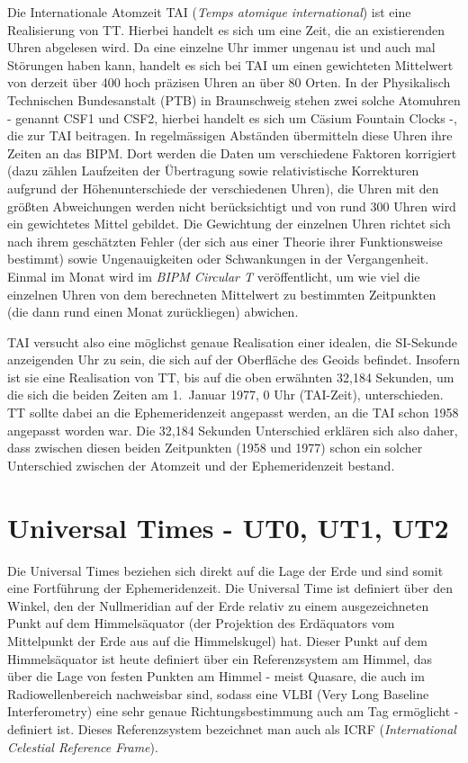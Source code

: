 Die Internationale Atomzeit TAI 
(\textit{Temps atomique international}) ist eine Realisierung von TT. Hierbei
handelt es sich um eine Zeit, die an existierenden Uhren abgelesen wird. Da eine einzelne Uhr immer
ungenau ist und auch mal St\"orungen haben kann, handelt es sich bei TAI um einen gewichteten
Mittelwert von derzeit \"uber 400 hoch pr\"azisen Uhren an \"uber 80 Orten. In der Physikalisch Technischen
Bundesanstalt (PTB) 
in Braunschweig stehen zwei solche Atomuhren - genannt CSF1 und CSF2, hierbei handelt
es sich um C\"asium Fountain Clocks -, die zur
TAI beitragen. In regelm\"assigen Abst\"anden \"ubermitteln diese Uhren ihre Zeiten an das
BIPM. Dort werden die Daten um verschiedene Faktoren korrigiert (dazu z\"ahlen Laufzeiten der \"Ubertragung
sowie relativistische Korrekturen aufgrund der H\"ohenunterschiede der verschiedenen Uhren), die
Uhren mit den gr\"o\ss ten Abweichungen werden nicht ber\"ucksichtigt und von rund 300 Uhren wird
ein gewichtetes Mittel gebildet. Die Gewichtung der einzelnen Uhren richtet sich nach ihrem gesch\"atzten 
Fehler (der sich aus einer Theorie ihrer Funktionsweise bestimmt) sowie Ungenauigkeiten oder
Schwankungen in der Vergangenheit. Einmal im Monat wird im
\textit{BIPM Circular T} ver\"offentlicht, um wie viel die einzelnen Uhren von dem berechneten Mittelwert
zu bestimmten Zeitpunkten (die dann rund einen Monat zur\"uckliegen) abwichen. 

TAI versucht also eine m\"oglichst genaue Realisation einer idealen, die SI-Sekunde anzeigenden Uhr
zu sein, die sich auf der Oberfl\"ache des Geoids befindet. 
Insofern ist sie eine Realisation von TT, bis auf die oben erw\"ahnten 32,184 Sekunden, um die
sich die beiden Zeiten am 1.\ Januar 1977, 0 Uhr (TAI-Zeit), unterschieden. TT sollte dabei an die Ephemeridenzeit
angepasst werden, an die TAI schon 1958 angepasst worden war. Die 32,184 Sekunden Unterschied
erkl\"aren sich also daher, dass zwischen diesen beiden Zeitpunkten (1958 und 1977) schon ein
solcher Unterschied zwischen der Atomzeit und der Ephemeridenzeit bestand. 

\section{Universal Times - UT0, UT1, UT2}

Die 
Universal Times beziehen sich direkt auf die Lage der Erde und sind somit eine Fortf\"uhrung
der Ephemeridenzeit. Die Universal Time ist definiert \"uber den Winkel, den der Nullmeridian auf der
Erde relativ zu einem ausgezeichneten Punkt auf dem Himmels\"aquator (der Projektion des Erd\"aquators
vom Mittelpunkt der Erde aus auf die Himmelskugel) hat. Dieser Punkt auf dem Himmels\"aquator
ist heute definiert \"uber ein Referenzsystem am Himmel, das \"uber die Lage von festen Punkten am
Himmel - meist Quasare, die auch im Radiowellenbereich nachweisbar sind, sodass eine VLBI (Very Long
Baseline Interferometry) eine sehr genaue Richtungsbestimmung auch am Tag erm\"oglicht - definiert ist. Dieses
Referenzsystem bezeichnet 
man auch als ICRF (\textit{International Celestial Reference Frame}).   

